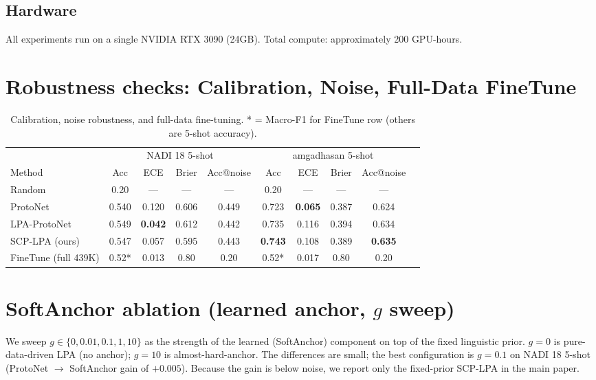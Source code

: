 \documentclass[11pt,a4paper]{article}
\begin{document}
\subsection{Hardware}
All experiments run on a single NVIDIA RTX 3090 (24GB). Total compute:
approximately 200 GPU-hours.

\section{Robustness checks: Calibration, Noise, Full-Data FineTune}
\label{app:robust}

\begin{table}[t]
\centering\small
\setlength{\tabcolsep}{3pt}
\begin{tabular}{lccccccccc}
\toprule
& \multicolumn{4}{c}{NADI 18 5-shot} & \multicolumn{4}{c}{amgadhasan 5-shot} \\
\cmidrule(lr){2-5} \cmidrule(lr){6-9}
Method & Acc & ECE & Brier & Acc@noise & Acc & ECE & Brier & Acc@noise \\
\midrule
Random      & 0.20 & --- & --- & --- & 0.20 & --- & --- & --- \\
ProtoNet    & 0.540 & 0.120 & 0.606 & 0.449 & 0.723 & \textbf{0.065} & 0.387 & 0.624 \\
LPA-ProtoNet & 0.549 & \textbf{0.042} & 0.612 & 0.442 & 0.735 & 0.116 & 0.394 & 0.634 \\
SCP-LPA (ours) & 0.547 & 0.057 & 0.595 & 0.443 & \textbf{0.743} & 0.108 & 0.389 & \textbf{0.635} \\
FineTune (full 439K) & 0.52* & 0.013 & 0.80 & 0.20 & 0.52* & 0.017 & 0.80 & 0.20 \\
\bottomrule
\end{tabular}
\caption{Calibration, noise robustness, and full-data fine-tuning.
* = Macro-F1 for FineTune row (others are 5-shot accuracy).}
\end{table}

\section{SoftAnchor ablation (learned anchor, $g$ sweep)}
\label{app:softanchor}

We sweep $g \in \{0, 0.01, 0.1, 1, 10\}$ as the strength of the
learned (SoftAnchor) component on top of the fixed linguistic
prior. $g{=}0$ is pure-data-driven LPA (no anchor); $g{=}10$ is
almost-hard-anchor. The differences are small; the best
configuration is $g{=}0.1$ on NADI 18 5-shot (ProtoNet $\to$
SoftAnchor gain of $+0.005$). Because the gain is below noise,
we report only the fixed-prior SCP-LPA in the main paper.
\end{document}
